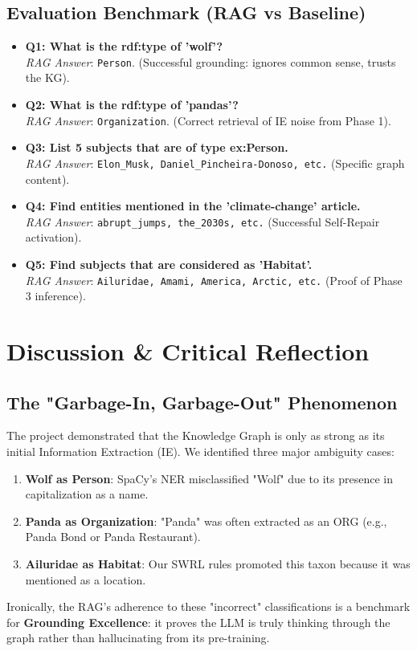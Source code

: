 \documentclass[11pt]{article}
\begin{document}
\subsection{Evaluation Benchmark (RAG vs Baseline)}
\begin{itemize}
    \item \textbf{Q1: What is the rdf:type of 'wolf'?}
    \\ \textit{RAG Answer}: \texttt{Person}. (Successful grounding: ignores common sense, trusts the KG).
    
    \item \textbf{Q2: What is the rdf:type of 'pandas'?}
    \\ \textit{RAG Answer}: \texttt{Organization}. (Correct retrieval of IE noise from Phase 1).
    
    \item \textbf{Q3: List 5 subjects that are of type ex:Person.}
    \\ \textit{RAG Answer}: \texttt{Elon\_Musk, Daniel\_Pincheira-Donoso, etc.} (Specific graph content).
    
    \item \textbf{Q4: Find entities mentioned in the 'climate-change' article.}
    \\ \textit{RAG Answer}: \texttt{abrupt\_jumps, the\_2030s, etc.} (Successful Self-Repair activation).
    
    \item \textbf{Q5: Find subjects that are considered as 'Habitat'.}
    \\ \textit{RAG Answer}: \texttt{Ailuridae, Amami, America, Arctic, etc.} (Proof of Phase 3 inference).
\end{itemize}

\section{Discussion \& Critical Reflection}

\subsection{The "Garbage-In, Garbage-Out" Phenomenon}
The project demonstrated that the Knowledge Graph is only as strong as its initial Information Extraction (IE). We identified three major ambiguity cases:
\begin{enumerate}
    \item \textbf{Wolf as Person}: SpaCy's NER misclassified "Wolf" due to its presence in capitalization as a name. 
    \item \textbf{Panda as Organization}: "Panda" was often extracted as an ORG (e.g., Panda Bond or Panda Restaurant).
    \item \textbf{Ailuridae as Habitat}: Our SWRL rules promoted this taxon because it was mentioned as a location.
\end{enumerate}
Ironically, the RAG's adherence to these "incorrect" classifications is a benchmark for \textbf{Grounding Excellence}: it proves the LLM is truly thinking through the graph rather than hallucinating from its pre-training.
\end{document}
